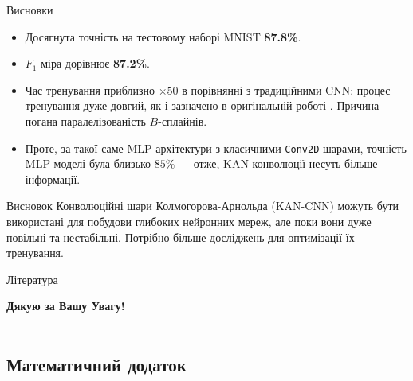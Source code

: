 \documentclass{zkdl-presentation-template}
\begin{document}
    \begin{frame}{Висновки}
        \begin{itemize}
            \item Досягнута точність на тестовому наборі MNIST \textbf{87.8\%}. 
            \item $F_1$ міра дорівнює \textbf{87.2\%}. \pause
            \item Час тренування приблизно $\times 50$ в порівнянні з 
            традиційними CNN: процес тренування дуже довгий, як і зазначено в 
            оригінальній роботі \cite{kan}. Причина --- погана паралелізованість 
            $B$-сплайнів.\pause
            \item Проте, за такої саме MLP архітектури з класичними
            \texttt{Conv2D} шарами, точність MLP моделі була близько $85\%$ --- отже,
            KAN конволюції несуть більше інформації.\pause
        \end{itemize}

        \begin{alertblock}{Висновок}
            Конволюційні шари Колмогорова-Арнольда (KAN-CNN) можуть бути
            використані для побудови глибоких нейронних мереж, але поки вони
            дуже повільні та нестабільні. Потрібно більше досліджень для
            оптимізації їх тренування.
        \end{alertblock}
    \end{frame}

    \begin{frame}[allowframebreaks]{Література}
        \printbibliography
    \end{frame}

    \begin{frame}
      \centering
      \LARGE
      \textbf{Дякую за Вашу Увагу!} \\
      
      \vspace{0.2cm} \Huge {} \large \\
    \end{frame}

    \subsection*{Математичний додаток}
\end{document}
